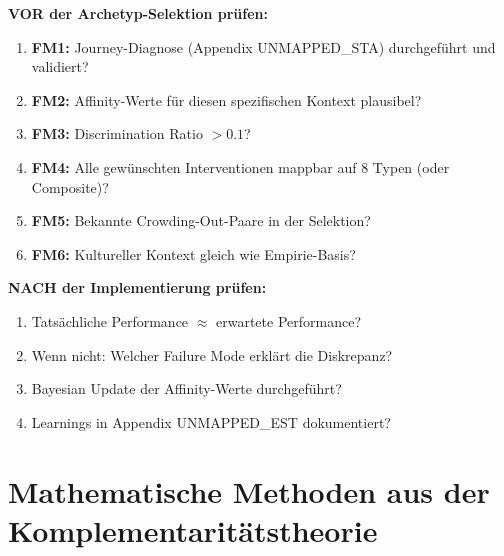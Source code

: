 \begin{tcolorbox}[colback=blue!5!white, colframe=blue!75!black,
    title=\textbf{Checkliste: Failure Mode Detection}]

\textbf{VOR der Archetyp-Selektion prüfen:}

\begin{enumerate}[nosep]
    \item[$\square$] \textbf{FM1:} Journey-Diagnose (Appendix UNMAPPED_STA) durchgeführt und validiert?
    \item[$\square$] \textbf{FM2:} Affinity-Werte für diesen spezifischen Kontext plausibel?
    \item[$\square$] \textbf{FM3:} Discrimination Ratio $> 0.1$?
    \item[$\square$] \textbf{FM4:} Alle gewünschten Interventionen mappbar auf 8 Typen (oder Composite)?
    \item[$\square$] \textbf{FM5:} Bekannte Crowding-Out-Paare in der Selektion?
    \item[$\square$] \textbf{FM6:} Kultureller Kontext gleich wie Empirie-Basis?
\end{enumerate}

\textbf{NACH der Implementierung prüfen:}

\begin{enumerate}[nosep]
    \item[$\square$] Tatsächliche Performance $\approx$ erwartete Performance?
    \item[$\square$] Wenn nicht: Welcher Failure Mode erklärt die Diskrepanz?
    \item[$\square$] Bayesian Update der Affinity-Werte durchgeführt?
    \item[$\square$] Learnings in Appendix UNMAPPED_EST dokumentiert?
\end{enumerate}

\end{tcolorbox}


\section{Mathematische Methoden aus der Komplementaritätstheorie}
\label{sec:hhh-complementarity-methods}

